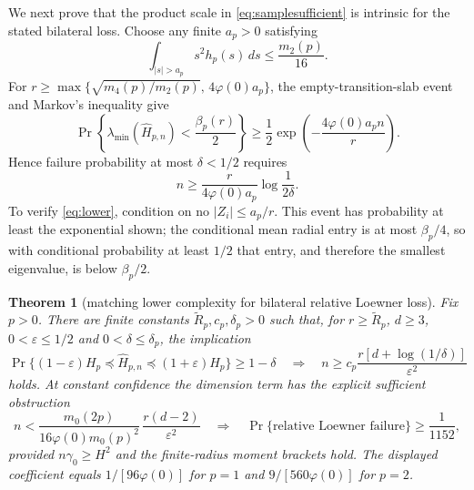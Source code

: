 \documentclass[11pt]{article}
\newtheorem{theorem}{Theorem}[section]
\begin{document}
We next prove that the product scale in \eqref{eq:samplesufficient} is intrinsic for the stated bilateral loss.
Choose any finite $a_p>0$ satisfying
\[
 \int_{|s|>a_p}s^2h_p(s)\,ds\le\frac{m_2(p)}{16}.
\]
For
$r\ge\max\{\sqrt{m_4(p)/m_2(p)},\,4\varphi(0)a_p\}$, the empty-transition-slab event and Markov's inequality give
\begin{equation}
 \Pr\!\left\{\lambda_{\min}(\widehat H_{p,n})<\frac{\beta_p(r)}2\right\}
 \ge\frac12\exp\!\left(-\frac{4\varphi(0)a_pn}{r}\right).
 \label{eq:lower}
\end{equation}
Hence failure probability at most $\delta<1/2$ requires
\begin{equation}
 n\ge\frac{r}{4\varphi(0)a_p}\log\frac1{2\delta}.
 \label{eq:lowern}
\end{equation}
To verify \eqref{eq:lower}, condition on no $|Z_i|\le a_p/r$.  This event has probability at least the exponential
shown; the conditional mean radial entry is at most $\beta_p/4$, so with conditional probability at least $1/2$
that entry, and therefore the smallest eigenvalue, is below $\beta_p/2$.

\begin{theorem}[matching lower complexity for bilateral relative Loewner loss]
\label{thm:matchinglower}
Fix $p>0$.  There are finite constants $\widetilde R_p,c_p,\delta_p>0$ such that, for $r\ge\widetilde R_p$,
$d\ge3$, $0<\varepsilon\le1/2$ and $0<\delta\le\delta_p$, the implication
\begin{equation}
 \Pr\{(1-\varepsilon)H_p\preceq\widehat H_{p,n}\preceq(1+\varepsilon)H_p\}\ge1-\delta
 \quad\Longrightarrow\quad
 n\ge c_p\frac{r[d+\log(1/\delta)]}{\varepsilon^2}
 \label{eq:matchinglower}
\end{equation}
holds.  At constant confidence the dimension term has the explicit sufficient obstruction
\begin{equation}
 n<\frac{m_0(2p)}{16\varphi(0)m_0(p)^2}\,
 \frac{r(d-2)}{\varepsilon^2}
 \quad\Longrightarrow\quad
 \Pr\{\text{relative Loewner failure}\}\ge\frac1{1152},
 \label{eq:explicitlower}
\end{equation}
provided $n\gamma_0\ge H^2$ and the finite-radius moment brackets hold.  The displayed coefficient equals
$1/[96\varphi(0)]$ for $p=1$ and $9/[560\varphi(0)]$ for $p=2$.
\end{theorem}
\end{document}
